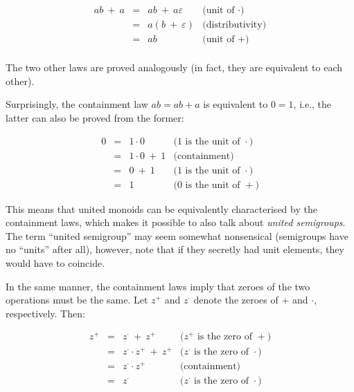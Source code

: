 \documentclass[crc,english]{programming}
\begin{document}
\vspace{-5mm}
\begin{equation*}
\begin{array}{rcll}
\textit{ab}\ +\ a & = & \textit{ab}\ +\ a\varepsilon & \text{(unit of $\cdot$)}\\
 & = & a(b\ +\ \varepsilon) & \text{(distributivity)}\\
 & = & \textit{ab} & \text{(unit of $+$)}\\
\end{array}
\end{equation*}
\vspace{-3mm}

\noindent
The two other laws are proved analogously (in fact, they are equivalent to each
other).

Surprisingly, the containment law $\textit{ab} = \textit{ab} + a$ is equivalent
to $0 = 1$, i.e., the latter can also be proved from the former:

\vspace{-5mm}
\begin{equation*}
\begin{array}{rcll}
0 & = & 1\cdot0 & \text{($1$ is the unit of $\cdot$)}\\
 & = & 1\cdot0\ +\ 1 & \text{(containment)}\\
 & = & 0\ +\ 1 & \text{($1$ is the unit of $\cdot$)}\\
 & = & 1 & \text{($0$ is the unit of $+$)}
\end{array}
\end{equation*}
\vspace{-3mm}

\noindent
This means that united monoids can be equivalently characterised by the
containment laws, which makes it possible to also talk about
\emph{united semigroups}. The term ``united semigroup'' may seem somewhat
nonsensical (semigroups have no ``units'' after all), however, note that if they
secretly had unit elements, they would have to coincide.

In the same manner, the containment laws imply that zeroes of the two operations
must be the same. Let $z^{+}$ and $z^{\cdot}$ denote the zeroes of $+$ and
$\cdot$, respectively. Then:

\vspace{-5mm}
\begin{equation*}
\begin{array}{rcll}
z^{+} & = & z^{\cdot}\ +\ z^{+} & \text{($z^{+}$ is the zero of $+$)}\\
 & = & z^{\cdot} \cdot z^{+}\ +\ z^{+} & \text{($z^{\cdot}$ is the zero of $\cdot$)}\\
 & = & z^{\cdot} \cdot z^{+} & \text{(containment)}\\
 & = & z^{\cdot} & \text{($z^{\cdot}$ is the zero of $\cdot$)}
\end{array}
\end{equation*}
\vspace{-3mm}
\end{document}
